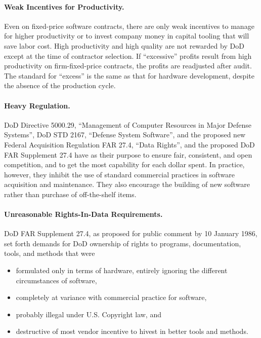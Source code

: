 \documentclass[11pt,final]{article}
\begin{document}
\paragraph{Weak Incentives for Productivity.}  Even on fixed-price software
contracts, there are only weak incentives to manage for higher productivity or
to invest company money in capital tooling that will save labor cost. High
productivity and high quality are not rewarded by DoD except at the time of
contractor selection. If “excessive” profits result from high productivity on
firm-fixed-price contracts, the profits are readjusted after audit. The
standard for “excess” is the same as that for hardware development, despite the
absence of the production cycle.

\paragraph{Heavy Regulation.} DoD Directive 5000.29, “Management of Computer
Resources in Major Defense Systems”, DoD STD 2167, “Defense System Software”,
and the proposed new Federal Acquisition Regulation FAR 27.4, “Data Rights”,
and the proposed DoD FAR Supplement 27.4 have as their purpose to ensure fair,
consistent, and open competition, and to get the most capability for each
dollar spent. In practice, however, they inhibit the use of standard commercial
practices in software acquisition and maintenance. They also encourage the
building of new software rather than purchase of off-the-shelf items.

\paragraph{Unreasonable Rights-In-Data Requirements.}  DoD FAR Supplement 27.4,
as proposed for public comment by 10 January 1986, set forth demands for DoD
ownership of rights to programs, documentation, tools, and methods that were

\begin{itemize}
    \item formulated only in terms of hardware, entirely ignoring the different circumstances of software,
    \item completely at variance with commercial practice for software,
    \item probably illegal under U.S. Copyright law, and
    \item destructive of most vendor incentive to hivest in better tools and methods.
\end{itemize}
\end{document}

